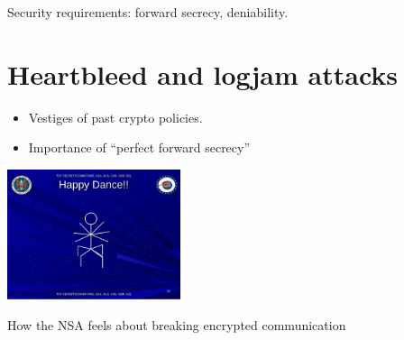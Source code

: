 Security requirements: forward secrecy, deniability.

\section{Heartbleed and logjam attacks}\label{14-Heartbleed-and-logjam-}

\begin{itemize}
\item
  Vestiges of past crypto policies.
\item
  Importance of ``perfect forward secrecy''
\end{itemize}

\begin{marginfigure}
\centering
\includegraphics[width=\linewidth, height=1.5in, keepaspectratio]{../figure/NSA_Page_29.jpg}
\caption{How the NSA feels about breaking encrypted communication}
\label{tmplabelfig}
\end{marginfigure}
